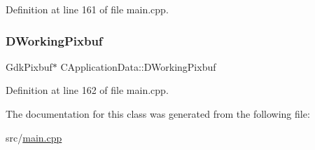 Definition at line 161 of file main.\+cpp.

\hypertarget{classCApplicationData_a19355c8cf25f216019db728219185119}{}\label{classCApplicationData_a19355c8cf25f216019db728219185119} 
\subsubsection{\texorpdfstring{D\+Working\+Pixbuf}{DWorkingPixbuf}}
{\footnotesize\ttfamily Gdk\+Pixbuf$\ast$ C\+Application\+Data\+::\+D\+Working\+Pixbuf\hspace{0.3cm}{\ttfamily [protected]}}



Definition at line 162 of file main.\+cpp.



The documentation for this class was generated from the following file\+:\begin{DoxyCompactItemize}
\item 
src/\hyperlink{main_8cpp}{main.\+cpp}\end{DoxyCompactItemize}
